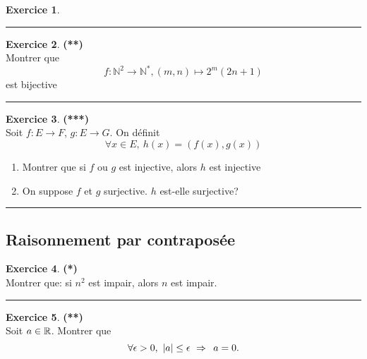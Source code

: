 \documentclass[a4paper,11pt]{article}
\theoremstyle{definition}
\newtheorem{exo}{Exercice} %
\begin{document}
\begin{minipage}{1\linewidth}
\begin{minipage}[t]{0.48\linewidth}
\begin{exo}
	\centering
	\rule{1\linewidth}{0.6pt}
\end{exo}

\begin{exo}\textbf{(**)}\quad\\[0.2cm]

Montrer que $$f : \mathbb{N}^{2} \longrightarrow \mathbb{N}^{*}, (m,n) \longmapsto 2^{m}(2n+1)$$ est bijective

\centering
\rule{1\linewidth}{0.6pt}
\end{exo}



\begin{exo}\textbf{(***)}\quad\\[0.2cm]
Soit $f : E \longrightarrow F$, $g : E \longrightarrow G$. On définit 
$$ \forall x \in E,\  h(x) = (f(x),g(x))$$
\begin{enumerate}
	\item Montrer que si $f$ ou $g$ est injective, alors $h$ est injective
	\item On suppose $f$ et $g$ surjective. $h$ est-elle surjective?
\end{enumerate}

	\centering
\rule{1\linewidth}{0.6pt}
\end{exo}


\subsection*{Raisonnement par contraposée}

\begin{exo}\textbf{(*)}\quad\\[0.2cm]
	Montrer que: si $n^2$ est impair, alors $n$ est impair. 
	
	\centering
	\rule{1\linewidth}{0.6pt}
\end{exo}


\begin{exo}\textbf{(**)}\quad\\[0.2cm]
Soit $a\in\mathbb{R}$. Montrer que 
 $$\forall \epsilon>0, \ |a|\leq\epsilon \ \Large\Rightarrow \ a=0.$$


\end{exo}
	\end{minipage}
\end{minipage}
\end{document}
